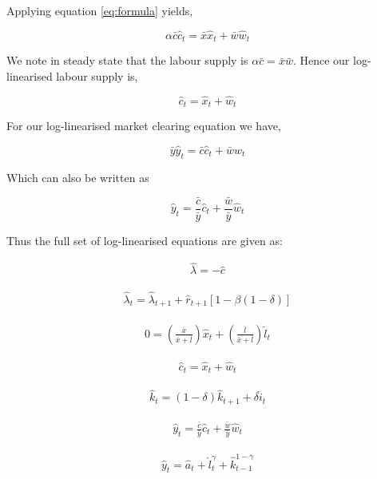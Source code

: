 \documentclass[
  11pt,
  justified]{article}
\begin{document}
Applying equation \ref{eq:formula} yields,

\[
\alpha \bar c \hat c_t = \bar x \hat x_t + \bar w \hat w_t
\]

We note in steady state that the labour supply is
\(\alpha \bar c = \bar x \bar w\). Hence our log-linearised labour
supply is,

\[
\hat c_t =  \hat x_t + \hat w_t
\]

For our log-linearised market clearing equation we have,

\[
\bar y \hat y_t = \bar c \hat c_t + \bar w \hat w_t
\]

Which can also be written as

\[
\hat y_t = \frac{\bar c}{\bar y} \hat c_t + \frac{\bar w}{\bar y} \hat w_t
\]

Thus the full set of log-linearised equations are given as:

\begin{align} 
\hat \lambda = - \hat c \tag{MU of consumption}
\label{eq:mu_of_consumption2}
\end{align}

\begin{align}
\hat \lambda_t = \hat \lambda_{t+1} + \hat r_{t+1} [1- \beta (1 - \delta)] \tag{Euler equation}
\label{eq:intertemporal_margin2}
\end{align}

\begin{align}
0 = (\frac{\bar x}{\bar x + \bar l} ) \hat x_t + (\frac{\bar l}{\bar x + \bar l} ) \hat l_t \tag{Time constraint}
\label{eq:time_constraint2}
\end{align}

\begin{align}
\hat c_t =  \hat x_t + \hat w_t \tag{Labour supply}
\label{eq:labour_supply2}
\end{align}

\begin{align}
\hat k_{t} = (1-\delta) \hat k_{t+1} + \delta \hat i_t \tag{Capital accumulation}
\label{eq:cap_accum2}
\end{align}

\begin{align}
\hat y_t = \frac{\bar c}{\bar y} \hat c_t + \frac{\bar w}{\bar y} \hat w_t \tag{Market clearing}
\label{eq:market_clearing2}
\end{align}

\begin{align}
\hat y_t = \hat a_t + \hat l_t^{\gamma}  + \hat k_{t-1}^{1 - \gamma}  \tag{Production function}
\label{eq:production_function2}
\end{align}
\end{document}
